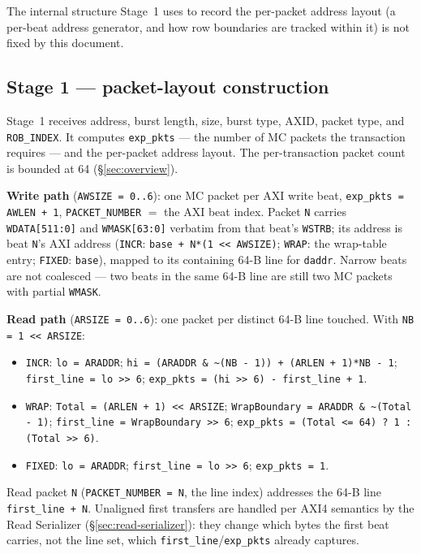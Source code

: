 \noindent The internal structure Stage~1 uses to record the per-packet
address layout (a per-beat address generator, and how row boundaries are
tracked within it) is not fixed by this document.

\subsection{Stage 1 --- packet-layout construction}

Stage~1 receives address, burst length, size, burst type, AXID, packet type,
and \texttt{ROB\_INDEX}.  It computes \texttt{exp\_pkts} --- the number of MC
packets the transaction requires --- and the per-packet address layout.  The
per-transaction packet count is bounded at 64 (\S\ref{sec:overview}).

\textbf{Write path} (\texttt{AWSIZE = 0..6}): one MC packet per AXI write
beat, \texttt{exp\_pkts = AWLEN + 1}, \texttt{PACKET\_NUMBER} $=$ the AXI beat
index.  Packet \texttt{N} carries \texttt{WDATA[511:0]} and \texttt{WMASK[63:0]}
verbatim from that beat's \texttt{WSTRB}; its address is beat \texttt{N}'s AXI
address (\texttt{INCR}: \texttt{base + N*(1 << AWSIZE)}; \texttt{WRAP}: the
wrap-table entry; \texttt{FIXED}: \texttt{base}), mapped to its containing
64-B line for \texttt{daddr}.  Narrow beats are not coalesced --- two beats in
the same 64-B line are still two MC packets with partial \texttt{WMASK}.

\textbf{Read path} (\texttt{ARSIZE = 0..6}): one packet per distinct 64-B
line touched.  With \texttt{NB = 1 << ARSIZE}:
\begin{itemize}[noitemsep]
  \item \texttt{INCR}: \texttt{lo = ARADDR};
        \texttt{hi = (ARADDR \& \textasciitilde(NB - 1)) + (ARLEN + 1)*NB - 1};
        \texttt{first\_line = lo >> 6};
        \texttt{exp\_pkts = (hi >> 6) - first\_line + 1}.
  \item \texttt{WRAP}: \texttt{Total = (ARLEN + 1) << ARSIZE};
        \texttt{WrapBoundary = ARADDR \& \textasciitilde(Total - 1)};
        \texttt{first\_line = WrapBoundary >> 6};
        \texttt{exp\_pkts = (Total <= 64) ? 1 : (Total >> 6)}.
  \item \texttt{FIXED}: \texttt{lo = ARADDR};
        \texttt{first\_line = lo >> 6}; \texttt{exp\_pkts = 1}.
\end{itemize}
Read packet \texttt{N} (\texttt{PACKET\_NUMBER = N}, the line index)
addresses the 64-B line \texttt{first\_line + N}.  Unaligned first transfers
are handled per AXI4 semantics by the Read Serializer
(\S\ref{sec:read-serializer}): they change which bytes the first beat
carries, not the line set, which \texttt{first\_line}/\texttt{exp\_pkts}
already captures.

